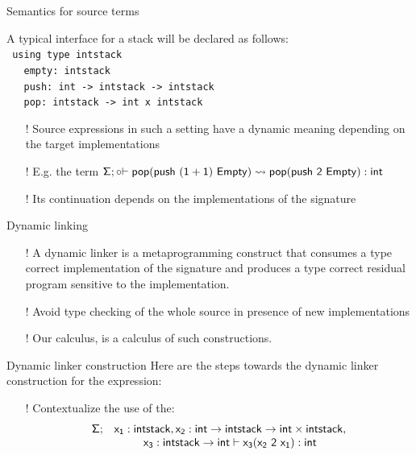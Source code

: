 \documentclass{beamer}
\begin{document}
   \begin{frame}{Semantics for source terms}
    
      
     A typical interface for a stack will be declared as follows:\\
    \texttt{
        using type intstack\\
       \ \ \    empty: intstack\\
       \ \ \    push: int -> intstack -> intstack\\
       \ \ \    pop: intstack -> int x intstack\\
    }
    \begin{itemize}
      \item[!] Source expressions in such a setting have a 
      dynamic meaning depending on the target implementations
      \item[!] E.g. the term ${\sf \Sigma}; {\sf \circ {\vdash pop (push \ (1+1) \ Empty)\rightsquigarrow pop (push \ 2 \ Empty) :int}}$
      \item [!] Its continuation depends on the implementations of the signature
    \end{itemize}
  \end{frame}
  \begin{frame}{Dynamic linking}
    \begin{itemize}
      \item 
      [!]A dynamic linker is a metaprogramming construct that consumes a type correct implementation of 
      the signature and produces a type correct residual program sensitive to the implementation.
      \item[!] Avoid type checking of the whole source in presence of new implementations 
      \item[!] Our calculus, is a calculus of such constructions.
    \end{itemize}
  \end{frame}
    \begin{frame} {Dynamic linker construction}
      Here are the steps towards the dynamic linker construction for the expression:
      \begin{itemize}
       \item[!] Contextualize the use of the:
      \[\begin{array}{c c} {\sf \Sigma;}& {\sf x_1:intstack, x_2:int\rightarrow intstack\rightarrow int\times intstack,}\\ & {\sf x_3:intstack\rightarrow int \vdash x_3 (x_2 \ 2\ x_1):int} \end{array} \]
       
      \end{itemize}

  \end{frame}
\end{document}
